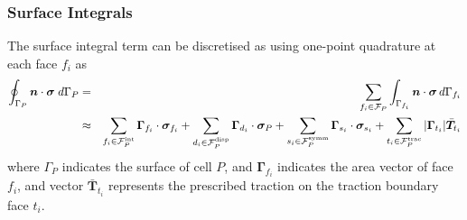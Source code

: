 \documentclass[sn-mathphys,Numbered]{sn-jnl}%
\newcommand{\bb}{\boldsymbol}
\begin{document}
\subsubsection{Surface Integrals}
The surface integral term can be discretised as using one-point quadrature at each face $f_i$ as
\begin{eqnarray} \label{eq:divStressDiscret}
	\oint_{\Gamma_P} \bb{n} \cdot \bb{\sigma}  \; d\Gamma_P
	&=& \sum_{f_i \in \mathcal{F}_P} \int_{\Gamma_{f_i}} \bb{n} \cdot \bb{\sigma}  \,  d \Gamma_{f_i} \notag \\
	&\approx&
	\sum_{f_i \in \mathcal{F}_P^{\text{int}}} \bb{\Gamma}_{f_i} \cdot \bb{\sigma}_{f_i}
	+ \sum_{d_i \in \mathcal{F}_P^{\text{disp}}} \bb{\Gamma}_{d_i} \cdot \bb{\sigma}_{P}
	+ \sum_{s_i \in \mathcal{F}_P^{\text{symm}}} \bb{\Gamma}_{s_i} \cdot \bb{\sigma}_{s_i}
	+ \sum_{t_i \in \mathcal{F}_P^{\text{trac}}} |\bb{\Gamma}_{t_i}| \bar{\bb{T}}_{t_i}
\end{eqnarray}
where $\Gamma_P$ indicates the surface of cell $P$, and $\bb{\Gamma}_{f_i}$ indicates the area vector of face $f_i$, and vector $\bar{\bb{T}}_{t_i}$ represents the prescribed traction on the traction boundary face $t_i$.
\end{document}
